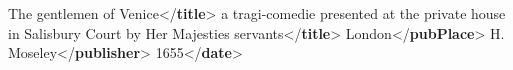 \begin{shaded}
\hspace*{1em}\hspace*{1em}\hspace*{1em}The gentlemen of Venice{</\textbf{title}>}\mbox{}\newline 
\hspace*{1em}\hspace*{1em}\hspace*{1em}a tragi-comedie presented at the private\mbox{}\newline 
\hspace*{1em}\hspace*{1em}\hspace*{1em}\hspace*{1em}\hspace*{1em}\hspace*{1em}\hspace*{1em}\hspace*{1em} house in Salisbury Court by Her Majesties servants{</\textbf{title}>}\mbox{}\newline 
\hspace*{1em}\hspace*{1em}\hspace*{1em}\mbox{}\newline 
\hspace*{1em}\hspace*{1em}\hspace*{1em}\hspace*{1em}London{</\textbf{pubPlace}>}\mbox{}\newline 
\hspace*{1em}\hspace*{1em}\hspace*{1em}\hspace*{1em}H. Moseley{</\textbf{publisher}>}\mbox{}\newline 
\hspace*{1em}\hspace*{1em}\hspace*{1em}\hspace*{1em}1655{</\textbf{date}>}\mbox{}\newline 

\end{shaded}
